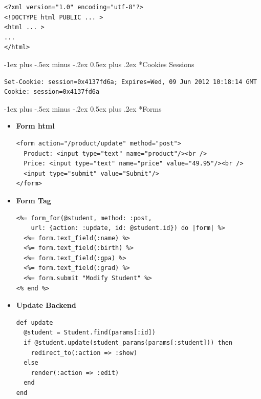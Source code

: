\documentclass[10pt,landscape]{article}
\makeatletter
\renewcommand{\section}{\@startsection{section}{1}{0mm}%
                                {-1ex plus -.5ex minus -.2ex}%
                                {0.5ex plus .2ex}%
                                {\normalfont\large\bfseries}}
\makeatother
\begin{document}
\begin{multicols}{2}
\begin{verbatim}
<?xml version="1.0" encoding="utf-8"?>
<!DOCTYPE html PUBLIC ... >
<html ... >
...
</html>
\end{verbatim}
\section*{Cookies Sessions}
\begin{verbatim}
Set-Cookie: session=0x4137fd6a; Expires=Wed, 09 Jun 2012 10:18:14 GMT
Cookie: session=0x4137fd6a
\end{verbatim}
\section*{Forms}
\begin{itemize}
\item \textbf{Form html}
\begin{verbatim}
<form action="/product/update" method="post">
  Product: <input type="text" name="product"/><br />
  Price: <input type="text" name="price" value="49.95"/><br />
  <input type="submit" value="Submit"/>
</form>
\end{verbatim}
\item \textbf{Form Tag}
\begin{verbatim}
<%= form_for(@student, method: :post,
    url: {action: :update, id: @student.id}) do |form| %>
  <%= form.text_field(:name) %>
  <%= form.text_field(:birth) %>
  <%= form.text_field(:gpa) %>
  <%= form.text_field(:grad) %>
  <%= form.submit "Modify Student" %>
<% end %>
\end{verbatim}
\item \textbf{Update Backend}
\begin{verbatim}
def update
  @student = Student.find(params[:id])
  if @student.update(student_params(params[:student])) then
    redirect_to(:action => :show)
  else
    render(:action => :edit)
  end
end


\end{verbatim}
\end{itemize}
\end{multicols}
\end{document}
